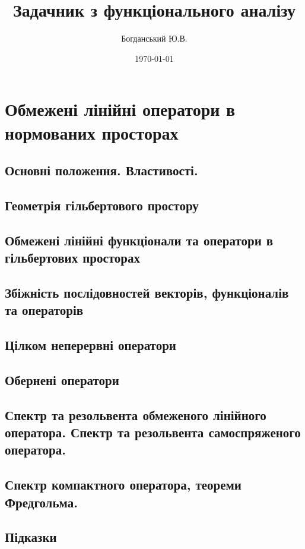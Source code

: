 \documentclass{extreport}
\author{Богданський Ю.В.}
\title{Задачник з функціонального аналізу}
\date{\today}
\begin{document}
    \maketitle
    \tableofcontents
    \chapter{Обмежені лінійні оператори в нормованих просторах}
        \section{Основні положення. Властивості.}
            
            
            
        \section{Геометрія гільбертового простору}
            
            
            
            
        \section{Обмежені лінійні функціонали та оператори в гільбертових просторах}
            
            
            
            
        \section{Збіжність послідовностей векторів, функціоналів та операторів}
            
            
            
        \section{Цілком неперервні оператори}
            
            
            
              
        \section{Обернені оператори}
            
            
            
        \section{Спектр та резольвента обмеженого лінійного оператора. 
                 Спектр та резольвента самоспряженого оператора.}
            
            
            
        \section{Спектр компактного оператора, теореми Фредгольма.}
            
            
            
        \newpage
        \section*{Підказки}
            
\end{document}
